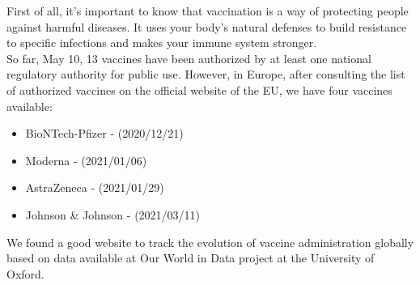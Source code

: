 First of all, it's important to know that vaccination is a way of protecting people against harmful diseases. It uses your body’s natural defenses to build resistance to specific infections and makes your immune system stronger.\\

So far, May 10, 13 vaccines have been authorized by at least one national regulatory authority for public use. However, in Europe, after consulting the list of authorized vaccines on the \cite {EU} official website of the \ac{EU}, we have four vaccines available: 
\begin{itemize}
    \item BioNTech-Pfizer - (2020/12/21)
    \item Moderna - (2021/01/06)
    \item AstraZeneca - (2021/01/29)
    \item Johnson & Johnson - (2021/03/11)
\end{itemize}

We found a \cite{reuters}good website to track the evolution of vaccine administration globally based on data available at \cite{owd} Our World in Data project at the University of Oxford.

